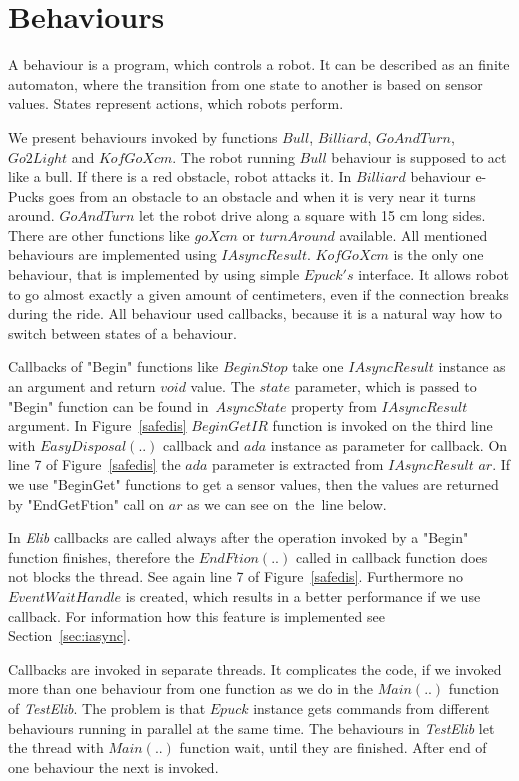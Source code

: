 \section{Behaviours} \label{sec:behaviours}
  A behaviour is a program, which controls a robot. It can be described as an finite automaton, 
  where the transition from one state to another is based on sensor values.
  States represent actions, which robots perform.
  
  We present behaviours invoked by functions $Bull$, $Billiard$, $GoAndTurn$, $Go2Light$ and $KofGoXcm$.
  The robot running $Bull$ behaviour is supposed to act like a bull. 
  If there is a red obstacle, robot attacks it. 
  In $Billiard$ behaviour e-Pucks goes from an obstacle to an obstacle
  and when it is very near it turns around.
  $GoAndTurn$ let the robot drive along a square with 15 cm long sides. 
  There are other functions like $goXcm$ or $turnAround$ available.
  All mentioned behaviours are implemented using $IAsyncResult$. 
  $KofGoXcm$ is the only one behaviour, that is implemented by using simple $Epuck's$ interface.
  It allows robot to go almost exactly a given amount of centimeters, even if the connection breaks during the ride.
  All behaviour used  callbacks, because it is a natural way how to switch between states of a behaviour.

  Callbacks of "Begin" functions like $BeginStop$ take one $IAsyncResult$ instance as an argument and return $void$ value.
  The $state$ parameter, which is passed to "Begin" function can be found 
  in~$AsyncState$ property from $IAsyncResult$ argument.
  In Figure~\ref{safedis} $BeginGetIR$ function is invoked on the third line 
   with $EasyDisposal(..)$ callback 
  and $ada$ instance as parameter for callback.
  On line 7 of Figure~\ref{safedis} the $ada$ parameter is extracted from $IAsyncResult$ $ar$.
  If we use "BeginGet" functions to get a sensor values, 
  then the values are returned by "EndGetFtion" call on $ar$ as we can see on~the~line below.

  In {\it Elib} callbacks are called always after the operation invoked by a "Begin" function finishes, 
  therefore the $EndFtion(..)$ called in callback function does not blocks the thread.
  See again line 7 of Figure~\ref{safedis}.
  Furthermore no $EventWaitHandle$ is created, which results in a better performance if we use callback.
  For information how this feature is implemented see Section~\ref{sec:iasync}.

  Callbacks are invoked in separate threads. It complicates the code, if we invoked more than one behaviour
  from one function as we do in the $Main(..)$ function of {\it TestElib}. 
  The problem is that $Epuck$ instance gets 
  commands from different behaviours running in parallel at the same time.
  The behaviours in {\it TestElib} let the thread with $Main(..)$ function wait, until they are finished.
  After end of one behaviour the next is invoked.
  
